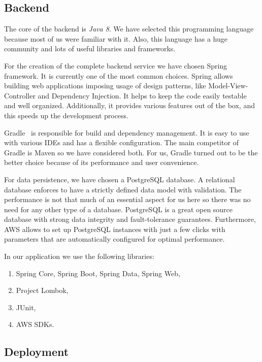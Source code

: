 \documentclass[licencjacka,en]{thesisclass}
\begin{document}
    \subsection{Backend}

    The core of the backend is \textit{Java 8}.
    We have selected this programming language because most of us were familiar with it.
    Also, this language has a huge community and lots of useful libraries and frameworks.

    For the creation of the complete backend service we have chosen Spring~\cite{Spring} framework.
    It is currently one of the most common choices.
    Spring allows building web applications imposing usage
    of design patterns, like Model-View-Controller and Dependency Injection.
    It helps to keep the code easily testable and well organized.
    Additionally, it provides various features out of the box,
    and this speeds up the development process.

    Gradle~\cite{Gradle} is responsible for build and dependency management.
    It is easy to use with various IDEs and has a flexible configuration.
    The main competitor of Gradle is Maven so we have considered both.
    For us, Gradle turned out to be the better choice because
    of its performance and user convenience.

    For data persistence, we have chosen a PostgreSQL database.
    A relational database enforces to have a strictly defined data model with validation.
    The performance is not that much of an essential aspect for us here
    so there was no need for any other type of a database.
    PostgreSQL is a great open source database with strong data integrity
    and fault-tolerance guarantees.
    Furthermore, AWS allows to set up PostgreSQL instances with just a few clicks
    with parameters that are automatically configured for optimal performance.

    In our application we use the following libraries:
    \begin{enumerate}
        \item Spring Core, Spring Boot, Spring Data, Spring Web,
        \item Project Lombok,
        \item JUnit,
        \item AWS SDKs.
    \end{enumerate}

    \subsection{Deployment}
\end{document}

